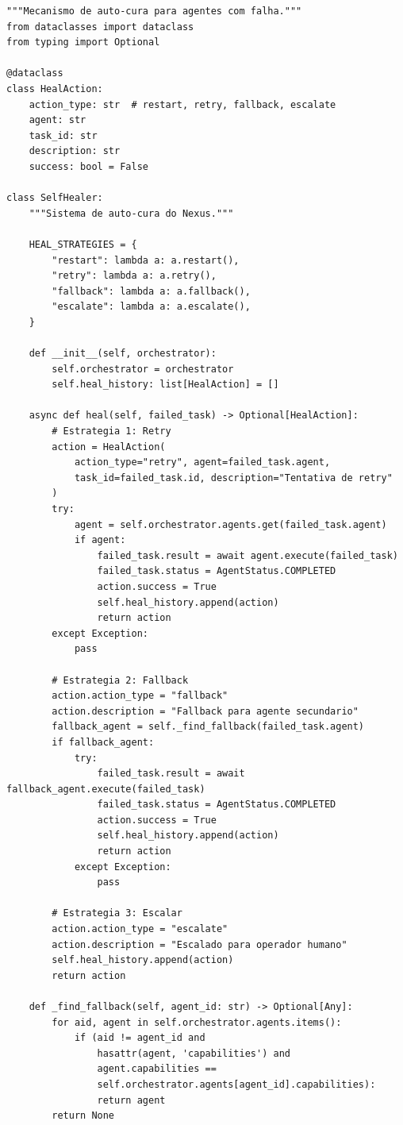 \begin{lstlisting}[style=pythonstyle, caption={Mecanismo de auto-cura},
                   label={lst:self-healer}]
"""Mecanismo de auto-cura para agentes com falha."""
from dataclasses import dataclass
from typing import Optional

@dataclass
class HealAction:
    action_type: str  # restart, retry, fallback, escalate
    agent: str
    task_id: str
    description: str
    success: bool = False

class SelfHealer:
    """Sistema de auto-cura do Nexus."""

    HEAL_STRATEGIES = {
        "restart": lambda a: a.restart(),
        "retry": lambda a: a.retry(),
        "fallback": lambda a: a.fallback(),
        "escalate": lambda a: a.escalate(),
    }

    def __init__(self, orchestrator):
        self.orchestrator = orchestrator
        self.heal_history: list[HealAction] = []

    async def heal(self, failed_task) -> Optional[HealAction]:
        # Estrategia 1: Retry
        action = HealAction(
            action_type="retry", agent=failed_task.agent,
            task_id=failed_task.id, description="Tentativa de retry"
        )
        try:
            agent = self.orchestrator.agents.get(failed_task.agent)
            if agent:
                failed_task.result = await agent.execute(failed_task)
                failed_task.status = AgentStatus.COMPLETED
                action.success = True
                self.heal_history.append(action)
                return action
        except Exception:
            pass

        # Estrategia 2: Fallback
        action.action_type = "fallback"
        action.description = "Fallback para agente secundario"
        fallback_agent = self._find_fallback(failed_task.agent)
        if fallback_agent:
            try:
                failed_task.result = await fallback_agent.execute(failed_task)
                failed_task.status = AgentStatus.COMPLETED
                action.success = True
                self.heal_history.append(action)
                return action
            except Exception:
                pass

        # Estrategia 3: Escalar
        action.action_type = "escalate"
        action.description = "Escalado para operador humano"
        self.heal_history.append(action)
        return action

    def _find_fallback(self, agent_id: str) -> Optional[Any]:
        for aid, agent in self.orchestrator.agents.items():
            if (aid != agent_id and
                hasattr(agent, 'capabilities') and
                agent.capabilities ==
                self.orchestrator.agents[agent_id].capabilities):
                return agent
        return None
\end{lstlisting}

